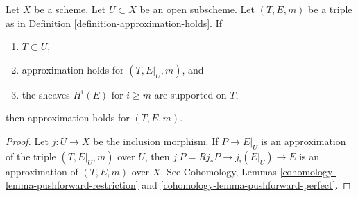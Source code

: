 \begin{lemma}
\label{lemma-open}
Let $X$ be a scheme. Let $U \subset X$ be an open subscheme.
Let $(T, E, m)$ be a triple as in
Definition \ref{definition-approximation-holds}.
If
\begin{enumerate}
\item $T \subset U$,
\item approximation holds for $(T, E|_U, m)$, and
\item the sheaves $H^i(E)$ for $i \geq m$ are supported on $T$,
\end{enumerate}
then approximation holds for $(T, E, m)$.
\end{lemma}

\begin{proof}
Let $j : U \to X$ be the inclusion morphism.
If $P \to E|_U$ is an approximation of the triple $(T, E|_U, m)$
over $U$, then $j_!P = Rj_*P \to j_!(E|_U) \to E$ is an approximation
of $(T, E, m)$ over $X$.
See Cohomology, Lemmas \ref{cohomology-lemma-pushforward-restriction} and
\ref{cohomology-lemma-pushforward-perfect}.
\end{proof}
